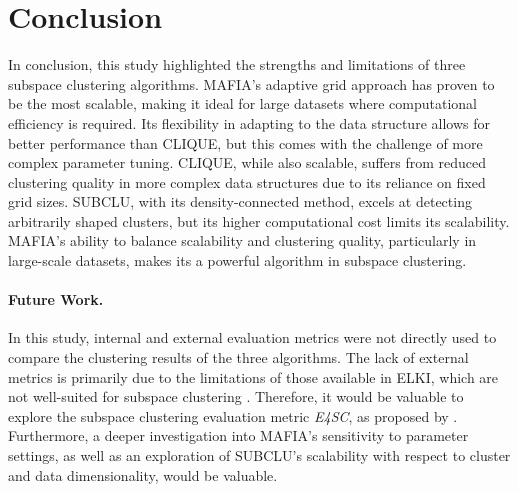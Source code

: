 \section{Conclusion}
In conclusion, this study highlighted the strengths and limitations of three subspace clustering algorithms. MAFIA's adaptive grid approach has proven to be the most scalable, making it ideal for large datasets where computational efficiency is required. Its flexibility in adapting to the data structure allows for better performance than CLIQUE, but this comes with the challenge of more complex parameter tuning. CLIQUE, while also scalable, suffers from reduced clustering quality in more complex data structures due to its reliance on fixed grid sizes. SUBCLU, with its density-connected method, excels at detecting arbitrarily shaped clusters, but its higher computational cost limits its scalability. MAFIA's ability to balance scalability and clustering quality, particularly in large-scale datasets, makes its a powerful algorithm in subspace clustering.

\paragraph{Future Work.}
In this study, internal and external evaluation metrics were not directly used to compare the clustering results of the three algorithms. The lack of external metrics is primarily due to the limitations of those available in ELKI, which are not well-suited for subspace clustering \cite{e4sc}. Therefore, it would be valuable to explore the subspace clustering evaluation metric \textit{E4SC}, as proposed by \cite{e4sc}. Furthermore, a deeper investigation into MAFIA's sensitivity to parameter settings, as well as an exploration of SUBCLU's scalability with respect to cluster and data dimensionality, would be valuable.